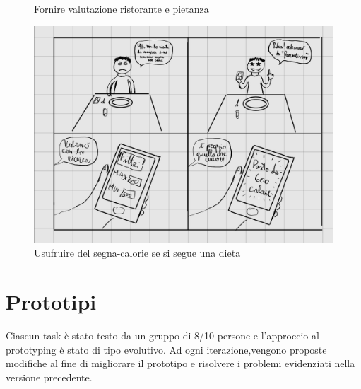\documentclass{article}
\begin{document}
\begin{figure}[htpb]
\begin{minipage}{0.40\textwidth}
    \caption[Terza figura]{Fornire valutazione ristorante e pietanza}\label{fig:3}
\end{minipage}
\hspace{2cm}
\begin{minipage}{0.40\textwidth}
    \includegraphics[width=\textwidth]{Data/StoryBoard/Filtro_calorie.jpeg}
    \caption[Quarta figura]{Usufruire del segna-calorie se si segue una dieta}\label{fig:4}
\end{minipage}
\end{figure}

\section{Prototipi}
    Ciascun task è stato testo da un gruppo di 8/10 persone e l'approccio al prototyping è stato di tipo evolutivo. Ad ogni iterazione,vengono proposte modifiche al fine di migliorare il prototipo e risolvere i problemi evidenziati nella versione precedente.\par
    
\end{document}
